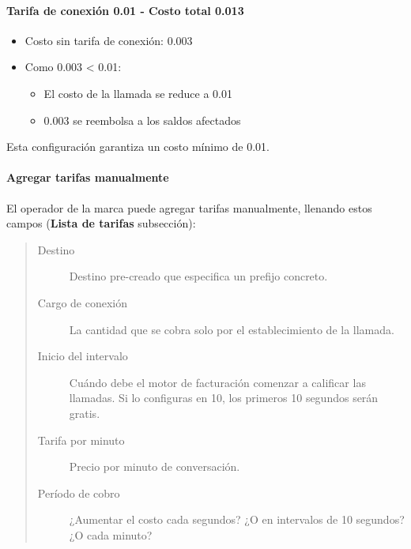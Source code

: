 \documentclass[letterpaper,10pt,spanish]{sphinxmanual}
\begin{document}
\paragraph{Tarifa de conexión 0.01 - Costo total 0.013}
\begin{itemize}
\item {} 
Costo sin tarifa de conexión: 0.003

\item {} 
Como 0.003 \textless{} 0.01:
\begin{itemize}
\item {} 
El costo de la llamada se reduce a 0.01

\item {} 
0.003 se reembolsa a los saldos afectados

\end{itemize}

\end{itemize}

Esta configuración garantiza un costo mínimo de 0.01.


\paragraph{Agregar tarifas manualmente}
\label{administration_portal/brand/billing/destination_rates:add-rates-manually}\label{administration_portal/brand/billing/destination_rates:id2}
El operador de la marca puede agregar tarifas manualmente, llenando estos campos (\textbf{Lista de tarifas} subsección):
\begin{quote}
\begin{description}
\item[{Destino}] \leavevmode
Destino pre-creado que especifica un prefijo concreto.

\item[{Cargo de conexión}] \leavevmode
La cantidad que se cobra solo por el establecimiento de la llamada.

\item[{Inicio del intervalo}] \leavevmode
Cuándo debe el motor de facturación comenzar a calificar las llamadas. Si lo configuras en 10, los primeros 10 segundos serán gratis.

\item[{Tarifa por minuto}] \leavevmode
Precio por minuto de conversación.

\item[{Período de cobro}] \leavevmode
¿Aumentar el costo cada segundos? ¿O en intervalos de 10 segundos? ¿O cada minuto?

\end{description}
\end{quote}
\end{document}
